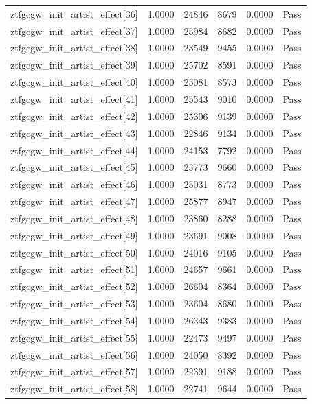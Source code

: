 \begin{table}[htbp]
\begin{tabular}{llrrll}
ztfgcgw\_init\_artist\_effect[36] & 1.0000 & 24846 & 8679 & 0.0000 & Pass \\
ztfgcgw\_init\_artist\_effect[37] & 1.0000 & 25984 & 8682 & 0.0000 & Pass \\
ztfgcgw\_init\_artist\_effect[38] & 1.0000 & 23549 & 9455 & 0.0000 & Pass \\
ztfgcgw\_init\_artist\_effect[39] & 1.0000 & 25702 & 8591 & 0.0000 & Pass \\
ztfgcgw\_init\_artist\_effect[40] & 1.0000 & 25081 & 8573 & 0.0000 & Pass \\
ztfgcgw\_init\_artist\_effect[41] & 1.0000 & 25543 & 9010 & 0.0000 & Pass \\
ztfgcgw\_init\_artist\_effect[42] & 1.0000 & 25306 & 9139 & 0.0000 & Pass \\
ztfgcgw\_init\_artist\_effect[43] & 1.0000 & 22846 & 9134 & 0.0000 & Pass \\
ztfgcgw\_init\_artist\_effect[44] & 1.0000 & 24153 & 7792 & 0.0000 & Pass \\
ztfgcgw\_init\_artist\_effect[45] & 1.0000 & 23773 & 9660 & 0.0000 & Pass \\
ztfgcgw\_init\_artist\_effect[46] & 1.0000 & 25031 & 8773 & 0.0000 & Pass \\
ztfgcgw\_init\_artist\_effect[47] & 1.0000 & 25877 & 8947 & 0.0000 & Pass \\
ztfgcgw\_init\_artist\_effect[48] & 1.0000 & 23860 & 8288 & 0.0000 & Pass \\
ztfgcgw\_init\_artist\_effect[49] & 1.0000 & 23691 & 9008 & 0.0000 & Pass \\
ztfgcgw\_init\_artist\_effect[50] & 1.0000 & 24016 & 9105 & 0.0000 & Pass \\
ztfgcgw\_init\_artist\_effect[51] & 1.0000 & 24657 & 9661 & 0.0000 & Pass \\
ztfgcgw\_init\_artist\_effect[52] & 1.0000 & 26604 & 8364 & 0.0000 & Pass \\
ztfgcgw\_init\_artist\_effect[53] & 1.0000 & 23604 & 8680 & 0.0000 & Pass \\
ztfgcgw\_init\_artist\_effect[54] & 1.0000 & 26343 & 9383 & 0.0000 & Pass \\
ztfgcgw\_init\_artist\_effect[55] & 1.0000 & 22473 & 9497 & 0.0000 & Pass \\
ztfgcgw\_init\_artist\_effect[56] & 1.0000 & 24050 & 8392 & 0.0000 & Pass \\
ztfgcgw\_init\_artist\_effect[57] & 1.0000 & 22391 & 9188 & 0.0000 & Pass \\
ztfgcgw\_init\_artist\_effect[58] & 1.0000 & 22741 & 9644 & 0.0000 & Pass \\

\end{tabular}
\end{table}
